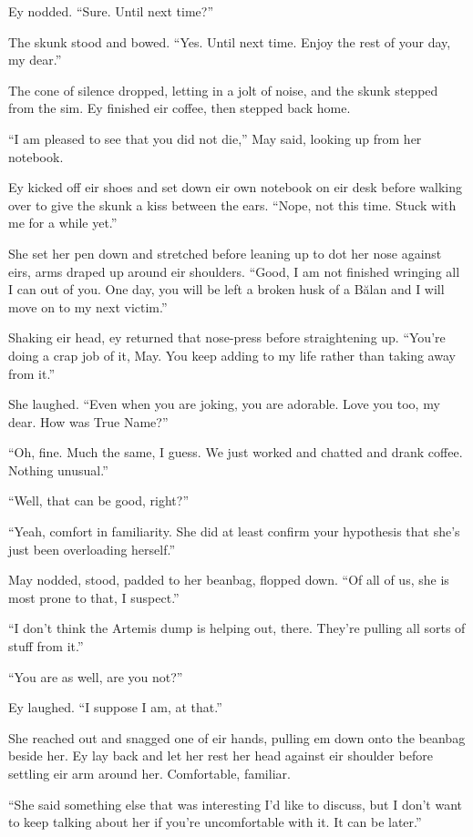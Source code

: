 Ey nodded. ``Sure. Until next time?''

The skunk stood and bowed. ``Yes. Until next time. Enjoy the rest of your day, my dear.''

The cone of silence dropped, letting in a jolt of noise, and the skunk stepped from the sim. Ey finished eir coffee, then stepped back home.

``I am pleased to see that you did not die,'' May said, looking up from her notebook.

Ey kicked off eir shoes and set down eir own notebook on eir desk before walking over to give the skunk a kiss between the ears. ``Nope, not this time. Stuck with me for a while yet.''

She set her pen down and stretched before leaning up to dot her nose against eirs, arms draped up around eir shoulders. ``Good, I am not finished wringing all I can out of you. One day, you will be left a broken husk of a Bălan and I will move on to my next victim.''

Shaking eir head, ey returned that nose-press before straightening up. ``You're doing a crap job of it, May. You keep adding to my life rather than taking away from it.''

She laughed. ``Even when you are joking, you are adorable. Love you too, my dear. How was True Name?''

``Oh, fine. Much the same, I guess. We just worked and chatted and drank coffee. Nothing unusual.''

``Well, that can be good, right?''

``Yeah, comfort in familiarity. She did at least confirm your hypothesis that she's just been overloading herself.''

May nodded, stood, padded to her beanbag, flopped down. ``Of all of us, she is most prone to that, I suspect.''

``I don't think the Artemis dump is helping out, there. They're pulling all sorts of stuff from it.''

``You are as well, are you not?''

Ey laughed. ``I suppose I am, at that.''

She reached out and snagged one of eir hands, pulling em down onto the beanbag beside her. Ey lay back and let her rest her head against eir shoulder before settling eir arm around her. Comfortable, familiar.

``She said something else that was interesting I'd like to discuss, but I don't want to keep talking about her if you're uncomfortable with it. It can be later.''

